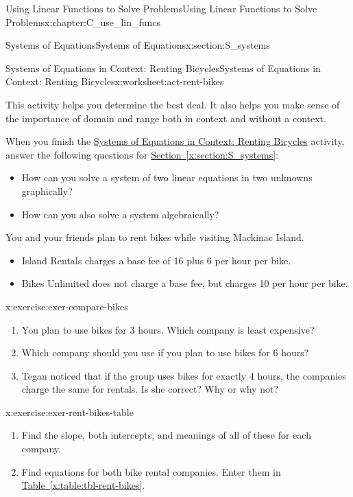 \documentclass[oneside,10pt,]{book}
\newcommand{\xreffont}{\relax}
\numberwithin{equation}{chapter}
\begin{document}
\begin{chapterptx}{Using Linear Functions to Solve Problems}{}{Using Linear Functions to Solve Problems}{}{}{x:chapter:C_use_lin_funcs}
\begin{sectionptx}{Systems of Equations}{}{Systems of Equations}{}{}{x:section:S_systems}
\begin{worksheet-subsection}{Systems of Equations in Context: Renting Bicycles}{}{Systems of Equations in Context: Renting Bicycles}{}{}{x:worksheet:act-rent-bikes}
\begin{introduction}{}
\par
This activity helps you determine the best deal. It also helps you make sense of the importance of domain and range both in context and without a context.%
\par
When you finish the \hyperref[x:worksheet:act-rent-bikes]{Systems of Equations in Context: Renting Bicycles} activity, answer the following questions for \hyperref[x:section:S_systems]{Section~{\xreffont\ref{x:section:S_systems}}}:%
\begin{itemize}[label=\textbullet]
\item{}How can you solve a system of two linear equations in two unknowns graphically?%
\item{}How can you also solve a system algebraically?%
\end{itemize}
%
\par
You and your friends plan to rent bikes while visiting Mackinac Island.%
\begin{itemize}[label=\textbullet]
\item{}Island Rentals charges a base fee of \textdollar{}16 plus \textdollar{}6 per hour per bike.%
\item{}Bikes Unlimited does not charge a base fee, but charges \textdollar{}10 per hour per bike.%
\end{itemize}
%
\end{introduction}%
\begin{divisionexercise}{1}{}{}{x:exercise:exer-compare-bikes}%
\begin{enumerate}[font=\bfseries,label=(\alph*),ref=\alph*]
\item{}You plan to use bikes for 3 hours. Which company is least expensive?%
\item{}Which company should you use if you plan to use bikes for 6 hours?%
\item{}Tegan noticed that if the group uses bikes for exactly 4 hours, the companies charge the same for rentals. Is she correct? Why or why not?%
\end{enumerate}
\end{divisionexercise}%
\begin{divisionexercise}{2}{}{}{x:exercise:exer-rent-bikes-table}%
\begin{enumerate}[font=\bfseries,label=(\alph*),ref=\alph*]
\item{}Find the slope, both intercepts, and meanings of all of these for each company.%
\item{}Find equations for both bike rental companies. Enter them in \hyperref[x:table:tbl-rent-bikes]{Table~{\xreffont\ref{x:table:tbl-rent-bikes}}}.%

\end{enumerate}
\end{divisionexercise}
\end{worksheet-subsection}
\end{sectionptx}
\end{chapterptx}
\end{document}
